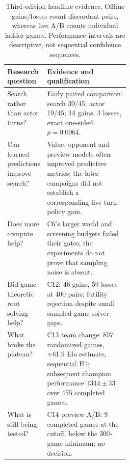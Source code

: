 \begin{table}[htbp]
\centering\small
\begin{tabularx}{\linewidth}{>{\raggedright\arraybackslash}p{0.29\linewidth} X}
\toprule
Research question & Evidence and qualification \\
\midrule
Search rather than actor turns? & Early paired comparison: search 30/45,
actor 19/45; 14 gains, 3 losses, exact one-sided $p=0.0064$. \\
Can learned predictions improve search? & Value, opponent and preview models
often improved predictive metrics; the later campaigns did not establish a
corresponding live turn-policy gain. \\
Does more compute help? & C6's larger world and screening budgets failed
their gates; the experiments do not prove that sampling noise is absent. \\
Did game-theoretic root solving help? & C12: 46 gains, 59 losses at 400 pairs;
futility rejection despite small sampled-game solver gaps. \\
What broke the plateau? & C13 team change: 897 randomized games, +61.9 Elo
estimate, sequential H1; subsequent champion performance $1344\pm33$ over
455 completed games. \\
What is still being tested? & C14 preview A/B: 9 completed games at the
cutoff, below the 300-game minimum; no decision. \\
\bottomrule
\end{tabularx}
\caption{Third-edition headline evidence. Offline gains/losses count
discordant pairs, whereas live A/B counts individual ladder games.
Performance intervals are descriptive, not sequential confidence sequences.}
\label{tab:headline}
\end{table}
